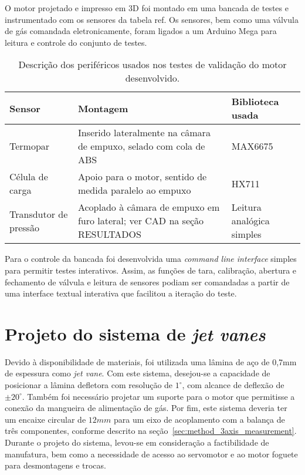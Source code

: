 O motor projetado e impresso em 3D foi montado em uma bancada de testes e instrumentado com os sensores da tabela ref. Os sensores, bem como uma válvula de gás comandada eletronicamente, foram ligados a um Arduino Mega para leitura e controle do conjunto de testes. 


\begin{table}[htbp]
    \centering\begin{tabular}{p{}p{}p{}} \toprule
        Sensor & Montagem & Biblioteca usada \\ \midrule
        Termopar & Inserido lateralmente na câmara de empuxo, selado com cola de ABS & MAX6675 \\
        Célula de carga & Apoio para o motor, sentido de medida paralelo ao empuxo & HX711 \\
        Transdutor de pressão & Acoplado à câmara de empuxo em furo lateral; ver CAD na seção RESULTADOS & Leitura analógica simples \\ \bottomrule
    \end{tabular}
    \caption{Descrição dos periféricos usados nos testes de validação do motor desenvolvido.}\label{tab:validation_peripherals}
\end{table}

Para o controle da bancada foi desenvolvida uma \textit{command line interface} simples para permitir testes interativos. Assim, as funções de tara, calibração, abertura e fechamento de válvula e leitura de sensores podiam ser comandadas a partir de uma interface textual interativa que facilitou a iteração do teste.

\section{Projeto do sistema de \textit{jet vanes}}\label{sec:method_jet_vanes}

Devido à disponibilidade de materiais, foi utilizada uma lâmina de aço de 0,7mm de espessura como \textit{jet vane}. Com este sistema, desejou-se a capacidade de posicionar a lâmina defletora com resolução de \(1^\circ \), com alcance de deflexão de \(\pm 20^\circ \). Também foi necessário projetar um suporte para o motor que permitisse a conexão da mangueira de alimentação de gás. Por fim, este sistema deveria ter um encaixe circular de \(12mm\) para um eixo de acoplamento com a balança de três componentes, conforme descrito na seção~\ref{sec:method_3axis_measurement}. Durante o projeto do sistema, levou-se em consideração a factibilidade de manufatura, bem como a necessidade de acesso ao servomotor e ao motor foguete para desmontagens e trocas.

